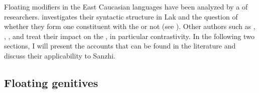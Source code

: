 Floating modifiers in the East Caucasian languages have been analyzed by a  of researchers. \citet{Kazenin2009} investigates their syntactic structure in Lak and the question of whether they form one constituent with the  or not (see ). Other authors such as \citet{Testelec1998a}, \citet{Creissels2013}, \citet{Komen2014}, and \citet{Lander2014, Lander2016} treat their impact on the , in particular contrastivity. In the following two sections, I will present the accounts that can be found in the literature and discuss their applicability to Sanzhi.









\subsection{Floating genitives}
\label{ssec:Extraposed genitives}

